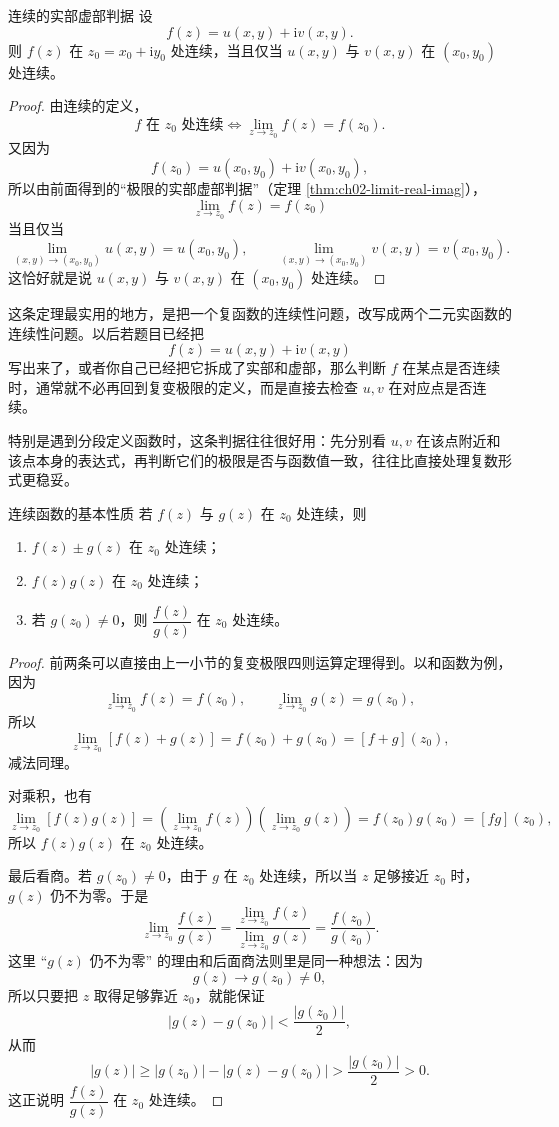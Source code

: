 \begin{dingli}{连续的实部虚部判据}{}
设
\[
    f(z)=u(x,y)+\mathrm{i}v(x,y).
\]
则 $f(z)$ 在 $z_0=x_0+\mathrm{i}y_0$ 处连续，当且仅当 $u(x,y)$ 与 $v(x,y)$ 在 $(x_0,y_0)$ 处连续。
\end{dingli}

\begin{proof}
由连续的定义，
\[
    f \text{ 在 } z_0 \text{ 处连续}
    \iff \lim_{z\to z_0}f(z)=f(z_0).
\]
又因为
\[
    f(z_0)=u(x_0,y_0)+\mathrm{i}v(x_0,y_0),
\]
所以由前面得到的``极限的实部虚部判据''（定理 \ref{thm:ch02-limit-real-imag}），
\[
    \lim_{z\to z_0}f(z)=f(z_0)
\]
当且仅当
\[
    \lim_{(x,y)\to(x_0,y_0)}u(x,y)=u(x_0,y_0),\qquad
    \lim_{(x,y)\to(x_0,y_0)}v(x,y)=v(x_0,y_0).
\]
这恰好就是说 $u(x,y)$ 与 $v(x,y)$ 在 $(x_0,y_0)$ 处连续。
\end{proof}

\begin{tishi}[这条判据怎么用]
这条定理最实用的地方，是把一个复函数的连续性问题，改写成两个二元实函数的连续性问题。以后若题目已经把
\[
    f(z)
    =u(x,y)+\mathrm{i}v(x,y)
\]
写出来了，或者你自己已经把它拆成了实部和虚部，那么判断 $f$ 在某点是否连续时，通常就不必再回到复变极限的定义，而是直接去检查 $u,v$ 在对应点是否连续。

特别是遇到分段定义函数时，这条判据往往很好用：先分别看 $u,v$ 在该点附近和该点本身的表达式，再判断它们的极限是否与函数值一致，往往比直接处理复数形式更稳妥。
\end{tishi}

\begin{dingli}{连续函数的基本性质}{}
若 $f(z)$ 与 $g(z)$ 在 $z_0$ 处连续，则
\begin{enumerate}
    \item $f(z)\pm g(z)$ 在 $z_0$ 处连续；
    \item $f(z)g(z)$ 在 $z_0$ 处连续；
    \item 若 $g(z_0)\neq 0$，则 $\dfrac{f(z)}{g(z)}$ 在 $z_0$ 处连续。
\end{enumerate}
\end{dingli}

\begin{proof}
前两条可以直接由上一小节的复变极限四则运算定理得到。以和函数为例，因为
\[
    \lim_{z\to z_0}f(z)=f(z_0),\qquad \lim_{z\to z_0}g(z)=g(z_0),
\]
所以
\[
    \lim_{z\to z_0}[f(z)+g(z)]=f(z_0)+g(z_0)=[f+g](z_0),
\]
减法同理。

对乘积，也有
\[
    \lim_{z\to z_0}[f(z)g(z)]
    =\left(\lim_{z\to z_0}f(z)\right)\left(\lim_{z\to z_0}g(z)\right)
    =f(z_0)g(z_0)
    =[fg](z_0),
\]
所以 $f(z)g(z)$ 在 $z_0$ 处连续。

最后看商。若 $g(z_0)\neq 0$，由于 $g$ 在 $z_0$ 处连续，所以当 $z$ 足够接近 $z_0$ 时，$g(z)$ 仍不为零。于是
\[
    \lim_{z\to z_0}\frac{f(z)}{g(z)}
    =\frac{\lim\limits_{z\to z_0}f(z)}{\lim\limits_{z\to z_0}g(z)}
    =\frac{f(z_0)}{g(z_0)}.
\]
这里 ``$g(z)$ 仍不为零'' 的理由和后面商法则里是同一种想法：因为
\[
    g(z)\to g(z_0)\neq 0,
\]
所以只要把 $z$ 取得足够靠近 $z_0$，就能保证
\[
    |g(z)-g(z_0)|<\frac{|g(z_0)|}{2},
\]
从而
\[
    |g(z)|\ge |g(z_0)|-|g(z)-g(z_0)|>\frac{|g(z_0)|}{2}>0.
\]
这正说明 $\dfrac{f(z)}{g(z)}$ 在 $z_0$ 处连续。
\end{proof}

